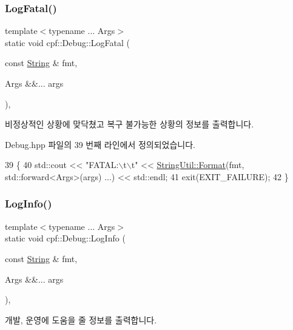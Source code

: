 \subsubsection{\texorpdfstring{Log\+Fatal()}{LogFatal()}}
{\footnotesize\ttfamily template$<$typename ... Args$>$ \\
static void cpf\+::\+Debug\+::\+Log\+Fatal (\begin{DoxyParamCaption}\item[{const \hyperlink{namespacecpf_a4dbd6992c3ed4440ce7ed8982ff7ffea}{String} \&}]{fmt,  }\item[{Args \&\&...}]{args }\end{DoxyParamCaption})\hspace{0.3cm}{\ttfamily [inline]}, {\ttfamily [static]}}

비정상적인 상황에 맞닥쳤고 복구 불가능한 상황의 정보를 출력합니다. 

Debug.\+hpp 파일의 39 번째 라인에서 정의되었습니다.


\begin{DoxyCode}
39                                                                \{
40             std::cout << \textcolor{stringliteral}{"FATAL:\(\backslash\)t\(\backslash\)t"} << \hyperlink{classcpf_1_1_string_util_a965cca44ea396f01f2f3c5e3851f1001}{StringUtil::Format}(fmt, std::forward<Args>(args)
      ...) << std::endl;
41             exit(EXIT\_FAILURE);
42         \}
\end{DoxyCode}
\mbox{\label{classcpf_1_1_debug_a4fdb5fd97498bef70585fcac8047efa2}} 
\subsubsection{\texorpdfstring{Log\+Info()}{LogInfo()}}
{\footnotesize\ttfamily template$<$typename ... Args$>$ \\
static void cpf\+::\+Debug\+::\+Log\+Info (\begin{DoxyParamCaption}\item[{const \hyperlink{namespacecpf_a4dbd6992c3ed4440ce7ed8982ff7ffea}{String} \&}]{fmt,  }\item[{Args \&\&...}]{args }\end{DoxyParamCaption})\hspace{0.3cm}{\ttfamily [inline]}, {\ttfamily [static]}}

개발, 운영에 도움을 줄 정보를 출력합니다. 

